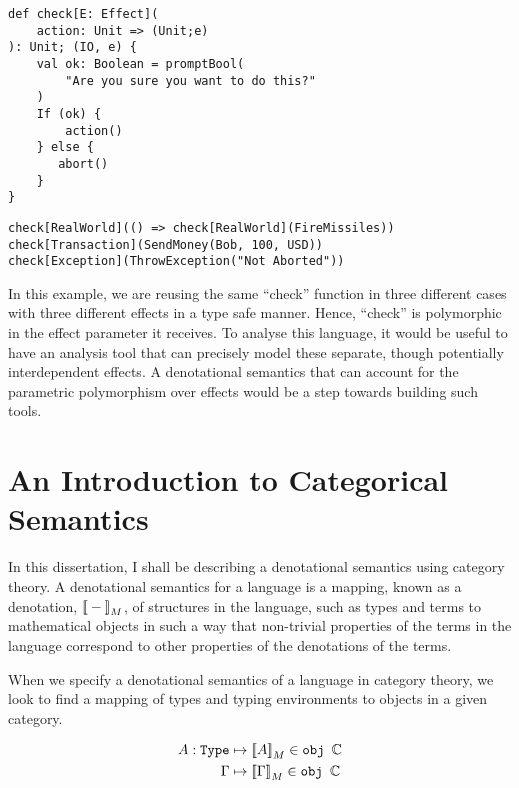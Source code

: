 \documentclass{Report}
\begin{document}
\begin{framed}
    \begin{framed}
        \begin{verbatim}
def check[E: Effect](
    action: Unit => (Unit;e)
): Unit; (IO, e) {
    val ok: Boolean = promptBool(
        "Are you sure you want to do this?"
    )
    If (ok) {
        action()
    } else {
       abort()
    }
}  
            \end{verbatim}
    \end{framed}

    \begin{framed}
        \begin{verbatim}
check[RealWorld](() => check[RealWorld](FireMissiles))
check[Transaction](SendMoney(Bob, 100, USD))
check[Exception](ThrowException("Not Aborted"))
        \end{verbatim}
    \end{framed}
\end{framed}

In this example, we are reusing the same “check” function in three different cases with three different effects in a type safe manner. Hence, “check” is polymorphic in the effect parameter it receives. To analyse this language, it would be useful to have an analysis tool that can precisely model these separate, though potentially interdependent effects. A denotational semantics that can account for the parametric polymorphism over effects would be a step towards building such tools.

\section{An Introduction to Categorical Semantics}
In this dissertation, I shall be describing a denotational semantics using category theory. A denotational semantics for a language is a mapping, known as a denotation, ${\bf [\![}-{\bf ]\!]}_M$, of structures in the language, such as types and terms to mathematical objects in such a way that non-trivial properties of the terms in the language correspond to other properties of the denotations of the terms.

When we specify a denotational semantics of a language in category theory, we look to find a mapping of types and typing environments to objects in a given category.

\begin{align}
    A: \texttt{Type} & \mapsto {\bf [\![}A{\bf ]\!]}_M \in \texttt{obj } \mathbb{C} \\
    \Gamma & \mapsto  {\bf [\![}\Gamma{\bf ]\!]}_M \in \texttt{obj } \mathbb{C}
\end{align}
\end{document}
